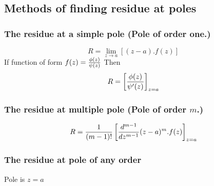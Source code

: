 \subsection{Methods of finding residue at poles}
 \subsubsection{The residue at a \textbf{simple pole} (Pole of order one.)}
 \[R = \lim_{z\rightarrow a}[(z-a).f(z)]\]
 If function of form $f(z) = {\phi (z) \over \psi (z)}$	 Then 
 \[R = \left[{\phi (z) \over \psi' (z)}\right]_{z=a} \]
 \subsubsection{The residue at multiple pole (Pole of order $m$.) }
 \[R = \frac{1}{(m-1)!}\left[{d^{m-1} \over {dz^{m-1}}}(z-a)^m.f(z)\right]_{z=a}\]
 \subsubsection{The residue at pole of any order}
 Pole is $z=a$
 

